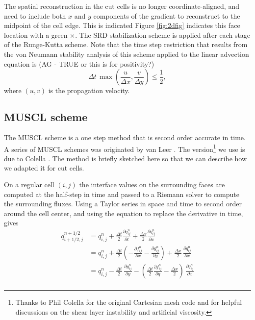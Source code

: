 The spatial reconstruction in the cut cells is no longer
coordinate-aligned, and need 
to include both $x$ and $y$ components of the gradient to 
reconstruct to the midpoint of the cell edge. This is indicated 
Figure \ref{fig:2dfig}  indicates this face location with a green $\times$.
The SRD stabilization scheme is applied after each stage of
the Runge-Kutta scheme. 
Note that the time step restriction that results from the von Neumann stability analysis of this scheme applied to the linear advection equation is  (AG -
TRUE or this is for positivity?)
\begin{equation}
\Delta t \,  \max\left(\frac{u}{\Delta x},\frac{v}{\Delta y}\right) \leq \frac{1}{2} ,
\end{equation}
where $(u,v)$ is the propagation velocity.  

\subsection{MUSCL scheme}
The MUSCL scheme is a one step method that is second order accurate in
time. A series of MUSCL schemes  was originated by van Leer 
\cite{vanleer:muscl}. The version\footnote{Thanks to Phil 
Colella for the original Cartesian mesh code and for helpful discussions on the shear
layer instability and artificial viscosity.}
we use is due to Colella \cite{Colella:Unsplit}.
The method is briefly sketched here so that we can describe how we
adapted it for cut cells. 

On a regular cell $(i,j)$ the interface values on the surrounding
faces are computed at the half-step in time and passed to a Riemann
solver to compute the surrounding fluxes.
Using a Taylor series in space and time to second order around the
cell center, and using the equation to replace the derivative in time,  gives
\begin{equation}\label{taylor}
\begin{split}
q_{i+1/2,j}^{n+1/2} & = q_{i,j}^n + 
              \frac{\Delta t}{2} \frac{\partial q_{ij}^n}{\partial t} + 
              \frac{\Delta x}{2} \frac{\partial q_{ij}^n}{\partial x} \\[.08in]
            &  = q_{i,j}^n + \frac{\Delta t}{2} 
            (-\frac{\partial f_{ij}^n}{\partial x} -
             \frac{\partial g_{ij}^n}{\partial y})  +
             \frac{\Delta x}{2} \, \frac{\partial q_{ij}^n}{\partial x} \\[.08in]
            &  = q_{i,j}^n - \frac{\Delta t}{2} \, 
             \frac{\partial g_{ij}^n}{\partial y}  -
            ( \frac{\Delta t}{2} 
            \frac{\partial f_{ij}^n}{\partial q} -
             \frac{\Delta x}{2} ) \,\frac{\partial q_{ij}^n}{\partial x} \\[.08in]
\end{split}
\end{equation}

